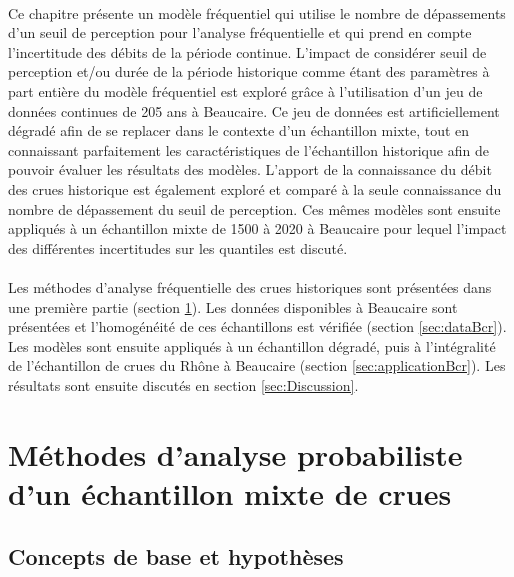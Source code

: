 \documentclass[11pt]{article}
\begin{document}
	\paragraph{} Ce chapitre présente un modèle fréquentiel qui utilise le nombre de dépassements d'un seuil de perception pour l'analyse fréquentielle et qui prend en compte l'incertitude des débits de la période continue. L'impact de considérer seuil de perception et/ou durée de la période historique comme étant des paramètres à part entière du modèle fréquentiel est exploré grâce à l'utilisation d'un jeu de données continues de 205 ans à Beaucaire. Ce jeu de données est artificiellement dégradé afin de se replacer dans le contexte d'un échantillon mixte, tout en connaissant parfaitement les caractéristiques de l'échantillon historique afin de pouvoir évaluer les résultats des modèles. L'apport de la connaissance du débit des crues historique est également exploré et comparé à la seule connaissance du nombre de dépassement du seuil de perception. Ces mêmes modèles sont ensuite appliqués à un échantillon mixte de 1500 à 2020 à Beaucaire pour lequel l'impact des différentes incertitudes sur les quantiles est discuté. 
	
	\paragraph{} Les méthodes d'analyse fréquentielle des crues historiques sont présentées dans une première partie (section \ref{sec:MethodoCh3}). Les données disponibles à Beaucaire sont présentées et l'homogénéité de ces échantillons est vérifiée (section \ref{sec:dataBcr}). Les modèles sont ensuite appliqués à un échantillon dégradé, puis à l'intégralité de l'échantillon de crues du Rhône à Beaucaire (section \ref{sec:applicationBcr}). Les résultats sont ensuite discutés en section \ref{sec:Discussion}.	
		
		
\section{Méthodes d'analyse probabiliste d'un échantillon mixte de crues}
\label{sec:MethodoCh3}
	
	\subsection{Concepts de base et hypothèses}
	\label{subsec:conceptsdebase}
	
	\paragraph{} 
	
\end{document}
